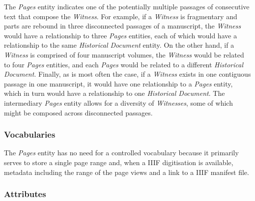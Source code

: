 The \textit{Pages} entity indicates one of the potentially multiple passages of consecutive text that compose the \textit{Witness}. For example, if a \textit{Witness} is fragmentary and parts are rebound in three disconnected passages of a manuscript, the \textit{Witness} would have a relationship to three \textit{Pages} entities, each of which would have a relationship to the same \textit{Historical Document} entity. On the other hand, if a \textit{Witness} is comprised of four manuscript volumes, the \textit{Witness} would be related to four \textit{Pages} entities, and each \textit{Pages} would be related to a different \textit{Historical Document}. Finally, as is most often the case, if a \textit{Witness} exists in one contiguous passage in one manuscript, it would have one relationship to a \textit{Pages} entity, which in turn would have a relationship to one \textit{Historical Document}. The intermediary \textit{Pages} entity allows for a diversity of \textit{Witnesses}, some of which might be composed across disconnected passages.

\subsubsection{Vocabularies}

The \textit{Pages} entity has no need for a controlled vocabulary because it primarily serves to store a single page range and, when a IIIF digitisation is available, metadata including the range of the page views and a link to a IIIF manifest file.

\subsubsection{Attributes}

